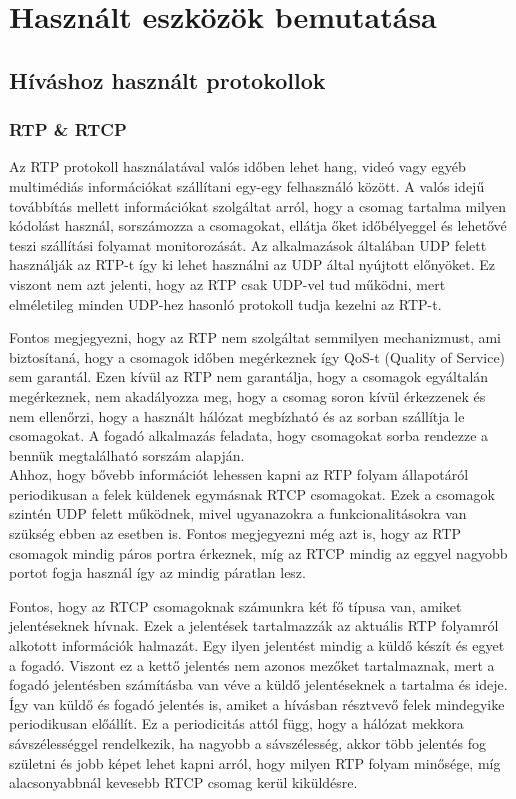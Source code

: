 \chapter{Használt eszközök bemutatása}

\section{Híváshoz használt protokollok}

\subsection{RTP \& RTCP}

Az RTP protokoll használatával valós időben lehet hang, videó vagy egyéb multimédiás 
információkat szállítani egy-egy felhasználó között. A valós idejű továbbítás mellett
információkat szolgáltat arról, hogy a csomag tartalma milyen kódolást használ, 
sorszámozza a csomagokat, ellátja őket időbélyeggel és lehetővé teszi szállítási folyamat
monitorozását. Az alkalmazások általában UDP felett használják az RTP-t így ki lehet
használni az UDP által nyújtott előnyöket. Ez viszont nem azt jelenti, hogy az RTP
csak UDP-vel tud működni, mert elméletileg minden UDP-hez hasonló protokoll tudja kezelni
az RTP-t.

Fontos megjegyezni, hogy az RTP nem szolgáltat semmilyen mechanizmust, ami biztosítaná,
hogy a csomagok időben megérkeznek így QoS-t (Quality of Service) sem garantál. Ezen kívül
az RTP nem garantálja, hogy a csomagok egyáltalán megérkeznek, nem akadályozza meg, hogy a 
csomag soron kívül érkezzenek és nem ellenőrzi, hogy a használt hálózat megbízható és az
sorban szállítja le csomagokat. A fogadó alkalmazás feladata, hogy csomagokat sorba rendezze
a bennük megtalálható sorszám alapján. \\

Ahhoz, hogy bővebb információt lehessen kapni az RTP folyam állapotáról periodikusan a 
felek küldenek egymásnak RTCP csomagokat. Ezek a csomagok szintén UDP felett működnek,
mivel ugyanazokra a funkcionalitásokra van szükség ebben az esetben is. Fontos megjegyezni
még azt is, hogy az RTP csomagok mindig páros portra érkeznek, míg az RTCP mindig az eggyel
nagyobb portot fogja használ így az mindig páratlan lesz.

Fontos, hogy az RTCP csomagoknak számunkra két fő típusa van, amiket jelentéseknek hívnak.
Ezek a jelentések tartalmazzák az aktuális RTP folyamról alkotott információk halmazát. Egy
ilyen jelentést mindig a küldő készít és egyet a fogadó. Viszont ez a kettő jelentés nem azonos
mezőket tartalmaznak, mert a fogadó jelentésben számításba van véve a küldő jelentéseknek 
a tartalma és ideje. Így van küldő és fogadó jelentés is, amiket a hívásban résztvevő felek 
mindegyike periodikusan előállít. Ez a periodicitás attól függ, hogy a hálózat mekkora 
sávszélességgel rendelkezik, ha nagyobb a sávszélesség, akkor több jelentés fog születni és
jobb képet lehet kapni arról, hogy milyen RTP folyam minősége, míg alacsonyabbnál kevesebb
RTCP csomag kerül kiküldésre. 

